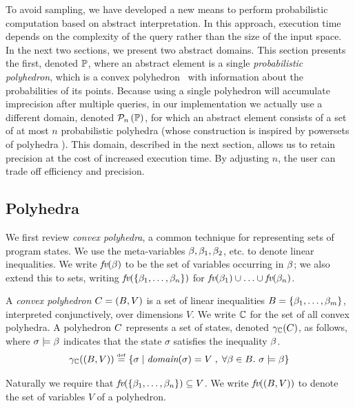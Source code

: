 To avoid sampling, we have developed a new means to perform probabilistic
computation based on abstract interpretation.  In this approach, execution time
depends on the complexity of the query rather than the size of the input space.
In the next two sections, we
present two abstract domains.  This section presents the first, denoted
$\mathbb{P}$, where an abstract element is a single \emph{probabilistic
  polyhedron}, which is a convex polyhedron~\cite{CousotHalbwachs78-POPL}
with information about the probabilities of its points.  Because using
a single polyhedron will accumulate imprecision after multiple queries, in our
implementation we actually use a different domain, denoted $ \mathcal{P}_{n}\left( \mathbb{P} \right) $, for
which an abstract element consists of a set of at most $n$ probabilistic
polyhedra (whose construction is inspired by powersets of polyhedra
\cite{bagnara06powerset,Popeea06inferringdisjunctive}).  This domain, described in the next section,
allows us to retain precision at the cost of increased execution time.  By
adjusting $n$, the user can trade off efficiency and precision.

\subsection{Polyhedra}

We first review \emph{convex polyhedra}, a common technique for representing sets of program states.  We use the meta-variables $\beta, \beta_1, \beta_2$, etc. to denote linear inequalities.  We write $\textit{fv}(\beta)$ to be the set of variables occurring in
$\beta$; we also extend this to sets, writing $\textit{fv}(\{\beta_1,\ldots,\beta_n\})$ for $\textit{fv}(\beta_1) \cup \ldots \cup \textit{fv}(\beta_n)$.

\begin{definition}
  A \emph{convex polyhedron} $C = (B, V)$ is a set of linear inequalities
  $B = \{\beta_1,\ldots,\beta_m\}$, interpreted conjunctively,
  over dimensions $ V $.  We write
  $\mathbb{C}$ for the set of all convex polyhedra.   A polyhedron $C$
  represents a set of states, denoted $\gamma_{\mathbb{C}}(C)$, as follows, where $\sigma \models \beta$ indicates that the state $\sigma$ satisfies the inequality $\beta$.
\[\gamma_{\mathbb{C}}(\left( B,V \right)) \stackrel{\smash{\scriptscriptstyle \mathrm{def}}}= \{\sigma \mid \textit{domain}(\sigma) =
V \;,\; \forall \beta \in B.\ \sigma \models \beta\}\]

Naturally we require that $\textit{fv}(\{\beta_1,\ldots,\beta_n\}) \subseteq V
$. We write $ \textit{fv}(\left( B, V \right)) $ to denote the set of variables $
V $ of a polyhedron.

\end{definition}

